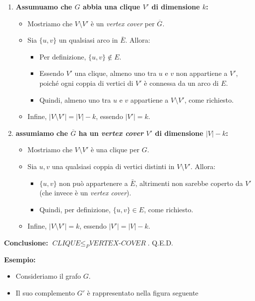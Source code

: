 \documentclass{article}
\begin{document}
\begin{enumerate}
    \item \textbf{Assumuamo che $G$ abbia una clique $V'$ di dimensione $k$:}
    \begin{itemize}
        \item Mostriamo che $V \setminus V'$ è un \textit{vertex cover} per $\overline{G}$.
        \item Sia $\{u, v\}$ un qualsiasi arco in $\bar{E}$. Allora:
        \begin{itemize}
            \item Per definizione, $\{u, v\} \notin E$.
            \item Essendo $V'$ una clique, almeno uno tra $u$ e $v$ non appartiene a $V'$, poiché ogni coppia di vertici di $V'$ è connessa da un arco di $E$.
            \item Quindi, almeno uno tra $u$ e $v$ appartiene a $V \setminus V'$, come richiesto.
        \end{itemize}
        \item Infine, $|V \setminus V'| = |V| - k$, essendo $|V'| = k$.
    \end{itemize}

    \item \textbf{assumiamo che $\overline{G}$ ha un \textit{vertex cover} $V'$ di dimensione $|V| - k$:}
    \begin{itemize}
        \item Mostriamo che $V \setminus V'$ è una clique per $G$.
        \item Sia $u, v$ una qualsiasi coppia di vertici distinti in $V \setminus V'$. Allora:
        \begin{itemize}
            \item $\{u, v\}$ non può appartenere a $\bar{E}$, altrimenti non sarebbe coperto da $V'$ (che invece è un \textit{vertex cover}).
            \item Quindi, per definizione, $\{u, v\} \in E$, come richiesto.
        \end{itemize}
        \item Infine, $|V \setminus V'| = k$, essendo $|V'| = |V| - k$.
    \end{itemize}
\end{enumerate}

\textbf{Conclusione:} $\textit{CLIQUE} \leq_P \textit{VERTEX-COVER}$. Q.E.D.


\textbf{Esempio:}
\begin{itemize}
    \item Consideriamo il grafo $G$.
    \item Il suo complemento $G'$ è rappresentato nella figura seguente
\end{itemize}
\end{document}
